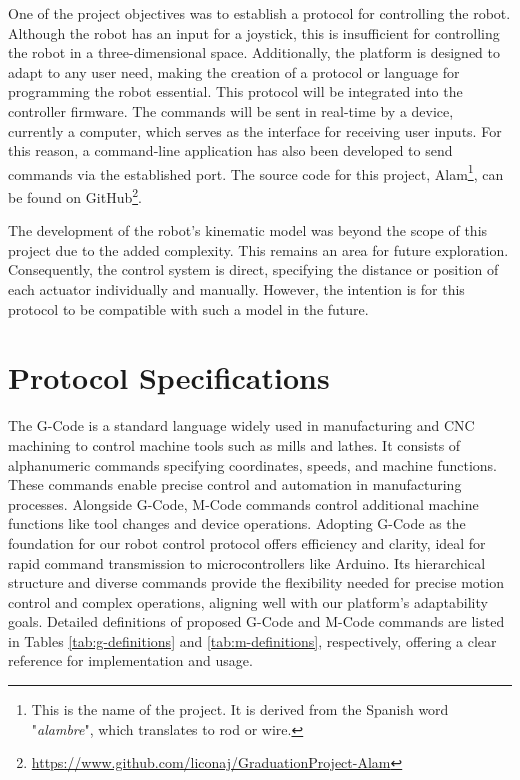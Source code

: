 One of the project objectives was to establish a protocol for controlling the robot. Although the robot has an input for a joystick, this is insufficient for controlling the robot in a three-dimensional space. Additionally, the platform is designed to adapt to any user need, making the creation of a protocol or language for programming the robot essential. This protocol will be integrated into the controller firmware. The commands will be sent in real-time by a device, currently a computer, which serves as the interface for receiving user inputs. For this reason, a command-line application has also been developed to send commands via the established port. The source code for this project, Alam\footnote{This is the name of the project. It is derived from the Spanish word "\textit{alambre}", which translates to rod or wire.}, can be found on GitHub\footnote{\url{https://www.github.com/liconaj/GraduationProject-Alam}}.

The development of the robot's kinematic model was beyond the scope of this project due to the added complexity. This remains an area for future exploration. Consequently, the control system is direct, specifying the distance or position of each actuator individually and manually. However, the intention is for this protocol to be compatible with such a model in the future.

\section{Protocol Specifications}

The G-Code is a standard language widely used in manufacturing and CNC machining to control machine tools such as mills and lathes. It consists of alphanumeric commands specifying coordinates, speeds, and machine functions. These commands enable precise control and automation in manufacturing processes. Alongside G-Code, M-Code commands control additional machine functions like tool changes and device operations. Adopting G-Code as the foundation for our robot control protocol offers efficiency and clarity, ideal for rapid command transmission to microcontrollers like Arduino. Its hierarchical structure and diverse commands provide the flexibility needed for precise motion control and complex operations, aligning well with our platform's adaptability goals. Detailed definitions of proposed G-Code and M-Code commands are listed in Tables \ref{tab:g-definitions} and \ref{tab:m-definitions}, respectively, offering a clear reference for implementation and usage.

